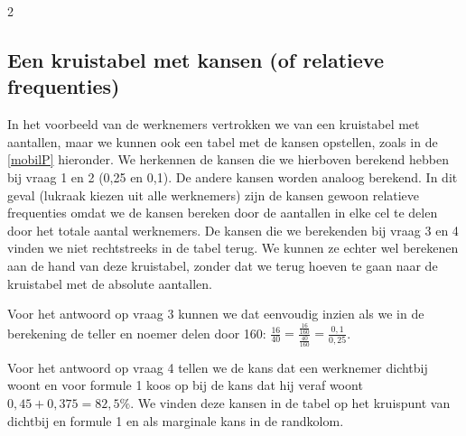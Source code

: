 \begin{multicols}{2}
\begin{vraagenantwoord}
\end{vraagenantwoord}

\subsection*{Een kruistabel met kansen (of relatieve frequenties)}
In het voorbeeld van de werknemers vertrokken we van een kruistabel met aantallen, maar we kunnen ook een tabel met de kansen opstellen, zoals in de \autoref{mobilP} hieronder. We herkennen de kansen die we hierboven berekend hebben bij vraag 1 en 2 (0,25 en 0,1). De andere kansen worden analoog berekend. In dit geval (lukraak kiezen uit alle werknemers) zijn de kansen gewoon relatieve frequenties omdat we de kansen bereken door de aantallen in elke cel te delen door het totale aantal werknemers. 
De kansen die we berekenden bij vraag 3 en 4 vinden we niet rechtstreeks in de tabel terug. We kunnen ze echter wel berekenen aan de hand van deze kruistabel, zonder dat we terug hoeven te gaan naar de kruistabel met de absolute aantallen. 

Voor het antwoord op vraag 3 kunnen we dat eenvoudig inzien als we in de berekening de teller en noemer delen door 160: $\frac{16}{40}=\frac{\frac{16}{160}}{\frac{40}{160}}=\frac{0,1}{0,25}$.

Voor het antwoord op vraag 4 tellen we de kans dat een werknemer dichtbij woont en voor formule 1 koos op bij de kans dat hij veraf woont $0,45+0,375=82,5\%$. We vinden deze kansen in de tabel op het kruispunt van dichtbij en formule 1 en als marginale kans in de randkolom.


\end{multicols}
